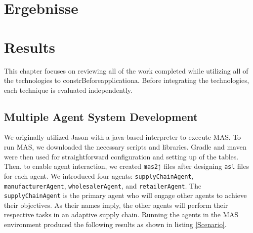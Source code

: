 {\chapter{Ergebnisse}}
{\chapter{Results}}

\label{sec:results}

This chapter focuses on reviewing all of the work completed while utilizing all of the technologies to constrBeforeapplicationa. Before integrating the technologies, each technique is evaluated independently.

\section{Multiple Agent System Development}

We originally utilized Jason with a java-based interpreter to execute \ac{MAS}. To run \ac{MAS}, we downloaded the necessary scripts and libraries. Gradle and maven were then used for straightforward configuration and setting up of the tables. Then, to enable agent interaction, we created \texttt{mas2j} files after designing \texttt{asl} files for each agent. We introduced four agents: \texttt{supplyChainAgent}, \texttt{manufacturerAgent}, \texttt{wholesalerAgent}, and \texttt{retailerAgent}. The \texttt{supplyChainAgent} is the primary agent who will engage other agents to achieve their objectives. As their names imply, the other agents will perform their respective tasks in an adaptive supply chain. Running the agents in the \ac{MAS} environment produced the following results as shown in listing \ref{Scenario}.

\vspace{.5cm}

